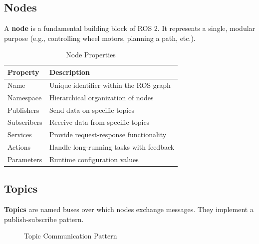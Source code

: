 \documentclass[a4paper,12pt]{book}
\newcommand{\important}[1]{\textbf{\color{ros2orange}#1}}
\begin{document}
\subsection{Nodes}
A \important{node} is a fundamental building block of ROS 2. It represents a single, modular purpose (e.g., controlling wheel motors, planning a path, etc.).

\begin{table}[H]
\centering
\begin{tabular}{|l|p{8cm}|}
\hline
\textbf{Property} & \textbf{Description} \\
\hline
Name & Unique identifier within the ROS graph \\
\hline
Namespace & Hierarchical organization of nodes \\
\hline
Publishers & Send data on specific topics \\
\hline
Subscribers & Receive data from specific topics \\
\hline
Services & Provide request-response functionality \\
\hline
Actions & Handle long-running tasks with feedback \\
\hline
Parameters & Runtime configuration values \\
\hline
\end{tabular}
\caption{Node Properties}
\label{tab:node_properties}
\end{table}

\subsection{Topics}
\important{Topics} are named buses over which nodes exchange messages. They implement a publish-subscribe pattern.

\begin{figure}[H]
\centering
{}
\caption{Topic Communication Pattern}
\label{fig:topic_pattern}
\end{figure}
\end{document}
